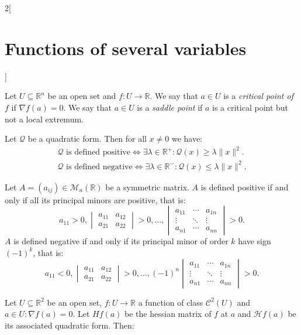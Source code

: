 \documentclass[../../../main.tex]{subfiles}
\begin{document}
\begin{multicols}{2}[\section{Functions of several variables}]
\begin{definition}
Let $U\subseteq\mathbb{R}^n$ be an open set and $f:U\rightarrow\mathbb{R}$. We say that $a\in U$ is a \textit{critical point of $f$} if $\nabla f(a)=0$. We say that $a\in U$ is a \textit{saddle point} if $a$ is a critical point but not a local extremum.
\end{definition}
\begin{theorem}
Let $\mathcal{Q}$ be a quadratic form. Then for all $x\ne 0$ we have:
\begin{gather*}
    \mathcal{Q}\text{ is defined positive}\iff\exists\lambda\in\mathbb{R}^+:\mathcal{Q}(x)\geq\lambda\|x\|^2.\\
    \mathcal{Q}\text{ is defined negative}\iff\exists\lambda\in\mathbb{R}^-:\mathcal{Q}(x)\leq\lambda\|x\|^2.
\end{gather*}
\end{theorem}
\begin{prop}
Let $A=(a_{ij})\in\mathcal{M}_n(\mathbb{R})$ be a symmetric matrix. $A$ is defined positive if and only if all its principal minors are positive, that is: $$a_{11}>0,\begin{vmatrix}
a_{11} & a_{12}\\
a_{21} & a_{22} \end{vmatrix}>0,\ldots,
\begin{vmatrix}
a_{11} &\cdots & a_{1n}\\
\vdots & \ddots & \vdots \\
a_{n1} & \cdots & a_{nn}
\end{vmatrix}>0.$$ $A$ is defined negative if and only if its principal minor of order $k$ have sign $(-1)^k$, that is: $$a_{11}<0,
\begin{vmatrix}
a_{11} & a_{12}\\
a_{21} & a_{22}
\end{vmatrix}>0,\ldots,
(-1)^n\begin{vmatrix}
a_{11} &\cdots & a_{1n}\\
\vdots & \ddots & \vdots \\
a_{n1} & \cdots & a_{nn}
\end{vmatrix}>0.$$
\end{prop}
\begin{theorem}
Let $U\subseteq\mathbb{R}^2$ be an open set, $f:U\rightarrow\mathbb{R}$ a function of class $\mathcal{C}^2(U)$ and $a\in U:\nabla f(a)=0$. Let $Hf(a)$ be the hessian matrix of $f$ at $a$ and $\mathcal{H}f(a)$ be its associated quadratic form. Then:
\begin{enumerate}

\end{enumerate}
\end{theorem}
\end{multicols}
\end{document}
